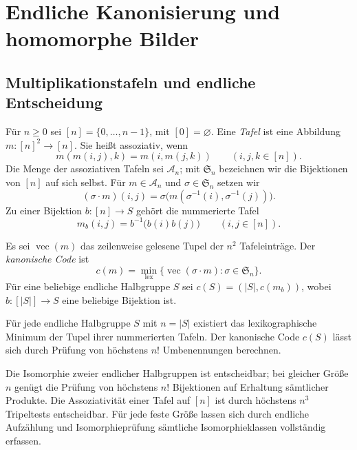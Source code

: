\chapter{Endliche Kanonisierung und homomorphe Bilder}

\section{Multiplikationstafeln und endliche Entscheidung}

\begin{definition}
Für $n\geq0$ sei $[n]=\{0,\ldots,n-1\}$, mit $[0]=\varnothing$.
Eine \emph{Tafel} ist eine Abbildung $m:[n]^2\to[n]$.
Sie heißt assoziativ, wenn
\[
 m(m(i,j),k)=m(i,m(j,k))\qquad(i,j,k\in[n]).
\]
Die Menge der assoziativen Tafeln sei $\mathcal A_n$; mit
$\mathfrak S_n$ bezeichnen wir die Bijektionen von $[n]$ auf sich selbst.
Für $m\in\mathcal A_n$ und $\sigma\in\mathfrak S_n$ setzen wir
\[
 (\sigma\cdot m)(i,j)
 =\sigma\bigl(m(\sigma^{-1}(i),\sigma^{-1}(j))\bigr).
\]
Zu einer Bijektion $b:[n]\to S$ gehört die nummerierte Tafel
\[
 m_b(i,j)=b^{-1}\bigl(b(i)b(j)\bigr)\qquad(i,j\in[n]).
\]
\end{definition}

\begin{definition}
Es sei $\operatorname{vec}(m)$ das zeilenweise gelesene Tupel der $n^2$
Tafeleinträge. Der \emph{kanonische Code} ist
\[
 c(m)=\min_{\mathrm{lex}}\{
       \operatorname{vec}(\sigma\cdot m):\sigma\in\mathfrak S_n\}.
\]
Für eine beliebige endliche Halbgruppe $S$ sei
$c(S)=(|S|,c(m_b))$, wobei $b:[|S|]\to S$ eine beliebige Bijektion ist.
\end{definition}

\begin{theorem}
Für jede endliche Halbgruppe $S$ mit $n=|S|$ existiert das
lexikographische Minimum der Tupel ihrer nummerierten Tafeln.
Der kanonische Code $c(S)$ lässt sich durch Prüfung von höchstens
$n!$ Umbenennungen berechnen.

Die Isomorphie zweier endlicher Halbgruppen ist entscheidbar;
bei gleicher Größe $n$ genügt die Prüfung von höchstens $n!$
Bijektionen auf Erhaltung sämtlicher Produkte.
Die Assoziativität einer Tafel auf $[n]$ ist durch höchstens
$n^3$ Tripeltests entscheidbar. Für jede feste Größe lassen sich
durch endliche Aufzählung und Isomorphieprüfung sämtliche
Isomorphieklassen vollständig erfassen.
\cite{projecttables}
\end{theorem}

